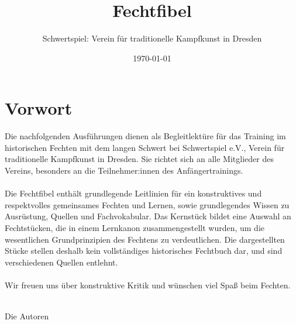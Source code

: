 \usepackage[T1]{fontenc}
\usepackage{lmodern}
\usepackage[ngerman]{babel}

\usepackage{graphicx}
\graphicspath{{Images/}}
\usepackage{xcolor}
\usepackage{tikz}

\usepackage{longtable}
\setlongtables
\setlength{\LTpre}{5pt}
\setlength{\LTpost}{0pt}
\usepackage{multicol}
\usepackage{enumerate}

\usepackage{placeins}

\usepackage[pass]{geometry}

\usepackage{fancyhdr}
\pagestyle{fancy}
\fancyhead[L]{\textsf{\rightmark}} %
\fancyhead[R]{\textsf{\leftmark}} %
\fancyfoot[C]{\textbf{\textsf{\thepage}}} %
\renewcommand{\headrulewidth}{1.4pt} %
\renewcommand{\footrulewidth}{1.4pt} %

\newcommand{\liniert}[2][0.5cm]{
    \begin{tikzpicture}[gray]
        \path[use as bounding box](0,0)rectangle(\linewidth,-#2*#1-0.5\pgflinewidth);
        \foreach \n in {1,...,#2}\draw(0 ,-#1*\n )--(\linewidth,-#1*\n );
    \end{tikzpicture}}

\title{Fechtfibel}
\author{Schwertspiel: Verein für traditionelle Kampfkunst in Dresden}
\date{\today}



\VariantTitlePage

\newpage
\setcounter{page}{1}

\section*{Vorwort}

Die nachfolgenden Ausführungen dienen als Begleitlektüre für das Training im historischen Fechten mit dem langen Schwert bei Schwertspiel e.V., Verein für traditionelle Kampfkunst in Dresden. Sie richtet sich an alle Mitglieder des Vereins, besonders an die Teilnehmer:innen des Anfängertrainings.
\\
\\
Die Fechtfibel enthält grundlegende Leitlinien für ein konstruktives und respektvolles gemeinsames Fechten und Lernen, sowie grundlegendes Wissen zu Ausrüstung, Quellen und Fachvokabular. Das Kernstück bildet eine Auswahl an Fechtstücken, die in einem Lernkanon zusammengestellt wurden, um die wesentlichen Grundprinzipien des Fechtens zu verdeutlichen. Die dargestellten Stücke stellen deshalb kein vollständiges historisches Fechtbuch dar, und sind verschiedenen Quellen entlehnt.
\\
\\
Wir  freuen uns über konstruktive Kritik und wünschen viel Spaß beim Fechten.
\\
\\
\begin{center}
Die Autoren
\end{center}

